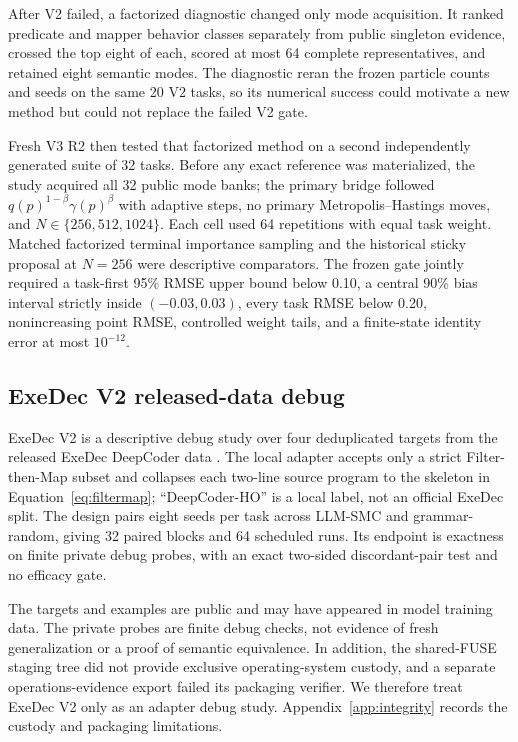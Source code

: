 \documentclass[twoside,11pt]{article}
\begin{document}
After V2 failed, a factorized diagnostic changed only mode acquisition. It
ranked predicate and mapper behavior classes separately from public singleton
evidence, crossed the top eight of each, scored at most 64 complete
representatives, and retained eight semantic modes. The diagnostic reran the
frozen particle counts and seeds on the same 20 V2 tasks, so its numerical
success could motivate a new method but could not replace the failed V2 gate.

Fresh V3 R2 then tested that factorized method on a second independently
generated suite of 32 tasks. Before any exact reference was materialized, the
study acquired all 32 public mode banks; the primary bridge followed
$q(p)^{1-\beta}\gamma(p)^{\beta}$ with adaptive steps, no primary
Metropolis--Hastings moves, and $N\in\{256,512,1024\}$. Each cell used 64
repetitions with equal task weight. Matched factorized terminal importance
sampling and the historical sticky proposal at $N=256$ were descriptive
comparators. The frozen gate jointly required a task-first 95\% RMSE upper
bound below 0.10, a central 90\% bias interval strictly inside
$(-0.03,0.03)$, every task RMSE below 0.20, nonincreasing point RMSE, controlled
weight tails, and a finite-state identity error at most $10^{-12}$.

\subsection{ExeDec V2 released-data debug}
\label{sec:exedec-debug}

ExeDec V2 is a descriptive debug study over four deduplicated targets from the
released ExeDec DeepCoder data \citep{shi2024exedec}. The local adapter accepts
only a strict Filter-then-Map subset and collapses each two-line source program
to the skeleton in Equation~\ref{eq:filtermap}; ``DeepCoder-HO'' is a local
label, not an official ExeDec split. The design pairs eight seeds per task
across LLM-SMC and grammar-random, giving 32 paired blocks and 64 scheduled
runs. Its endpoint is exactness on finite private debug probes, with an exact
two-sided discordant-pair test and no efficacy gate.

The targets and examples are public and may have appeared in model training
data. The private probes are finite debug checks, not evidence of fresh
generalization or a proof of semantic equivalence. In addition, the shared-FUSE
staging tree did not provide exclusive operating-system custody, and a separate
operations-evidence export failed its packaging verifier. We therefore treat
ExeDec V2 only as an adapter debug study. Appendix~\ref{app:integrity} records
the custody and packaging limitations.
\end{document}
